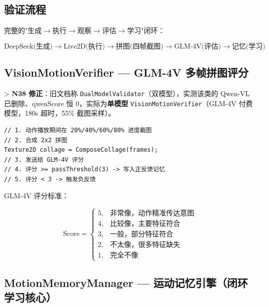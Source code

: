 \documentclass[12pt,a4paper]{ctexart}
\begin{document}
\subsection{验证流程}

完整的"生成$\rightarrow$执行$\rightarrow$观察$\rightarrow$评估$\rightarrow$学习"闭环：

\[
\text{DeepSeek(生成)} \rightarrow \text{Live2D(执行)} \rightarrow \text{拼图(四帧截图)} \rightarrow \text{GLM-4V(评估)} \rightarrow \text{记忆(学习)}
\]

\subsection{VisionMotionVerifier --- GLM-4V 多帧拼图评分}

> \textbf{N38 修正}：旧文档称 \texttt{DualModelValidator}（双模型），实测该类的 Qwen-VL 已删除、qwenScore 恒 0，实际为\textbf{单模型} \texttt{VisionMotionVerifier}（GLM-4V 付费模型，180s 超时，55\% 截图采样）。

\begin{lstlisting}[style=csharp,caption={多帧拼图验证核心},label={lst:collage}]
// 1. 动作播放期间在 20%/40%/60%/80% 进度截图
// 2. 合成 2x2 拼图
Texture2D collage = ComposeCollage(frames);
// 3. 发送给 GLM-4V 评分
// 4. 评分 >= passThreshold(3) -> 写入正反馈记忆
// 5. 评分 < 3 -> 触发负反馈
\end{lstlisting}

GLM-4V 评分标准：

\[
\text{Score} =
\begin{cases}
5, & \text{非常像，动作精准传达意图} \\
4, & \text{比较像，主要特征符合} \\
3, & \text{一般，部分特征符合} \\
2, & \text{不太像，很多特征缺失} \\
1, & \text{完全不像}
\end{cases}
\]

\subsection{MotionMemoryManager --- 运动记忆引擎（闭环学习核心）}
\end{document}
